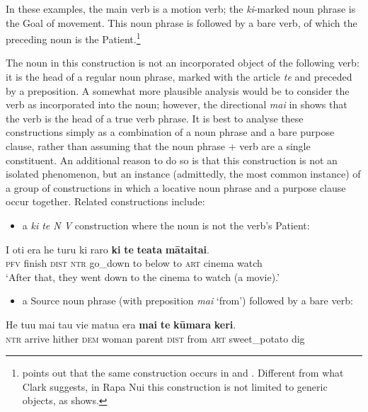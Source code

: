 In these examples, the main verb is a motion verb; the \textit{ki}{}-marked noun phrase is the Goal of movement. This noun phrase is followed by a bare verb, of which the preceding noun is the Patient.\footnote{\label{fn:533}\citet[424]{Clark1983Review} points out that the same construction occurs in  and . Different from what Clark suggests, in Rapa Nui this construction is not limited to generic objects, as  shows.}  

The noun in this construction is not an incorporated object of the following verb: it is the head of a regular noun phrase, marked with the article \textit{te} and preceded by a preposition. A somewhat more plausible analysis would be to consider the verb as incorporated into the noun; however, the directional \textit{mai} in  shows that the verb is the head of a true verb phrase. It is best to analyse these constructions simply as a combination of a noun phrase and a bare purpose clause, rather than assuming that the noun phrase + verb are a single constituent. An additional reason to do so is that this construction is not an isolated phenomenon, but an instance (admittedly, the most common instance) of a group of constructions in which a locative noun phrase and a purpose clause occur together. Related constructions include:

\begin{itemize}
\item
a \textit{ki te N V} construction where the noun is not the verb’s Patient:
\end{itemize}

\ea\label{ex:11.249}
\gll I oti era he turu ki raro \textbf{ki} \textbf{te} \textbf{teata} \textbf{māta{\ꞌ}ita{\ꞌ}i}. \\
\textsc{pfv} finish \textsc{dist} \textsc{ntr} go\_down to below to \textsc{art} cinema watch \\

\glt
‘After that, they went down to the cinema to watch (a movie).’ \textstyleExampleref{[R210.145]} 
\z

\begin{itemize}
\item 
a Source noun phrase (with preposition \textit{mai} ‘from’) followed by a bare verb:
\end{itemize}

\ea\label{ex:11.250}
\gll He tu{\ꞌ}u mai tau vi{\ꞌ}e matu{\ꞌ}a era \textbf{mai} \textbf{te} \textbf{kūmara} \textbf{keri}. \\
\textsc{ntr} arrive hither \textsc{dem} woman parent \textsc{dist} from \textsc{art} sweet\_potato dig \\

